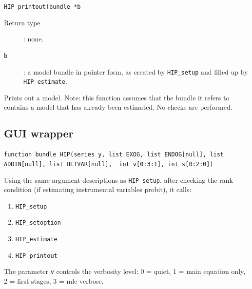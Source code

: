 \documentclass[a4paper,10pt]{article}
\newenvironment{funcdoc}[1]
{\noindent\hrulefill\newline\texttt{#1}\par\noindent\hrulefill\par\medskip\par}
{\bigskip}
\newcommand{\cmd}[1]{\texttt{#1}}
\newcounter{script}[section]
\begin{document}
\begin{funcdoc}{HIP\_printout(bundle *b}
\begin{description}
  \item[Return type]: none.
  \item[\texttt{b}]: a model bundle in pointer form, as created by
    \cmd{HIP\_setup} and filled up by \cmd{HIP\_estimate}.
  \end{description}
  Prints out a model. Note: this function assumes that the bundle it
  refers to contains a model that has already been estimated. No
  checks are performed.
\end{funcdoc}

\subsection{GUI wrapper}
\label{sec:syntax_GUI}

\begin{funcdoc}{function bundle HIP(series y, list EXOG, list ENDOG[null],\ 
		    list ADDIN[null], list HETVAR[null], \
		    int v[0:3:1], int s[0:2:0])}
Using the same argument descriptions as \texttt{HIP\_setup}, after
checking the rank condition (if estimating instrumental variables
probit), it calls:
  \begin{enumerate}
  \item \texttt{HIP\_setup}
  \item \texttt{HIP\_setoption}
  \item \texttt{HIP\_estimate}
  \item \texttt{HIP\_printout}
\end{enumerate}
The parameter \cmd{v} controls the verbosity level: 0 = quiet, 1 =
main equation only, 2 = first stages, 3 = mle verbose.

\end{funcdoc}
\end{document}
